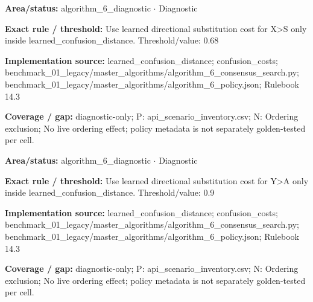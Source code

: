 \begin{tcolorbox}[enhanced,breakable,colback=white,colframe=Muted!45,boxrule=0.45pt,arc=1.5pt,left=6pt,right=6pt,top=5pt,bottom=5pt,title={\texttt{A6-LEARNED-SUBSTITUTION-X-S}},title after break={\texttt{A6-LEARNED-SUBSTITUTION-X-S}\ (continued)},fonttitle=\headingfont\bfseries\color{Navy},coltitle=Navy]
\textbf{Area/status:} algorithm\_\allowbreak{}6\_\allowbreak{}diagnostic $\boldsymbol{\cdot}$ Diagnostic\par
\smallskip
\textbf{Exact rule / threshold:} Use learned directional substitution cost for X>S only inside learned\_\allowbreak{}confusion\_\allowbreak{}distance. Threshold/\allowbreak{}value: 0.68\par
\smallskip
\textbf{Implementation source:} learned\_\allowbreak{}confusion\_\allowbreak{}distance; confusion\_\allowbreak{}costs; benchmark\_\allowbreak{}01\_\allowbreak{}legacy/\allowbreak{}master\_\allowbreak{}algorithms/\allowbreak{}algorithm\_\allowbreak{}6\_\allowbreak{}consensus\_\allowbreak{}search.py; benchmark\_\allowbreak{}01\_\allowbreak{}legacy/\allowbreak{}master\_\allowbreak{}algorithms/\allowbreak{}algorithm\_\allowbreak{}6\_\allowbreak{}policy.json; Rulebook 14.3\par
\smallskip
\textbf{Coverage / gap:} diagnostic-only; P: api\_\allowbreak{}scenario\_\allowbreak{}inventory.csv; N: Ordering exclusion; No live ordering effect; policy metadata is not separately golden-tested per cell.
\end{tcolorbox}
\begin{tcolorbox}[enhanced,breakable,colback=white,colframe=Muted!45,boxrule=0.45pt,arc=1.5pt,left=6pt,right=6pt,top=5pt,bottom=5pt,title={\texttt{A6-LEARNED-SUBSTITUTION-Y-A}},title after break={\texttt{A6-LEARNED-SUBSTITUTION-Y-A}\ (continued)},fonttitle=\headingfont\bfseries\color{Navy},coltitle=Navy]
\textbf{Area/status:} algorithm\_\allowbreak{}6\_\allowbreak{}diagnostic $\boldsymbol{\cdot}$ Diagnostic\par
\smallskip
\textbf{Exact rule / threshold:} Use learned directional substitution cost for Y>A only inside learned\_\allowbreak{}confusion\_\allowbreak{}distance. Threshold/\allowbreak{}value: 0.9\par
\smallskip
\textbf{Implementation source:} learned\_\allowbreak{}confusion\_\allowbreak{}distance; confusion\_\allowbreak{}costs; benchmark\_\allowbreak{}01\_\allowbreak{}legacy/\allowbreak{}master\_\allowbreak{}algorithms/\allowbreak{}algorithm\_\allowbreak{}6\_\allowbreak{}consensus\_\allowbreak{}search.py; benchmark\_\allowbreak{}01\_\allowbreak{}legacy/\allowbreak{}master\_\allowbreak{}algorithms/\allowbreak{}algorithm\_\allowbreak{}6\_\allowbreak{}policy.json; Rulebook 14.3\par
\smallskip
\textbf{Coverage / gap:} diagnostic-only; P: api\_\allowbreak{}scenario\_\allowbreak{}inventory.csv; N: Ordering exclusion; No live ordering effect; policy metadata is not separately golden-tested per cell.
\end{tcolorbox}

